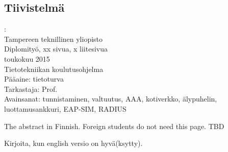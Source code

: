 \documentclass[12pt,a4paper,english]{tutthesis}
\begin{document}
\begin{otherlanguage}{finnish} %
\chapter*{Tiivistelmä}         %

\begin{spacing}{1.0}
         {\bf \textsf{\MakeUppercase{\@author}}}: \@titleB\\  %
         \textsf{Tampereen teknillinen yliopisto}\\
         \textsf{Diplomityö, xx sivua, x liitesivua}\\ %
         \textsf{toukokuu 2015}\\
         \textsf{Tietotekniikan koulutusohjelma}\\
         \textsf{Pääaine: tietoturva}\\
         \textsf{Tarkastaja:  Prof. \@examiner}\\ %
         \textsf{Avainsanat: tunnistaminen, valtuutus, AAA, kotiverkko, älypuhelin, luottamusankkuri, EAP-SIM, RADIUS}\\
\end{spacing}
The abstract in Finnish. Foreign students do not need this page.
TBD

Kirjoita, kun english versio on hyvä(ksytty).
\end{otherlanguage} %
\end{document}
